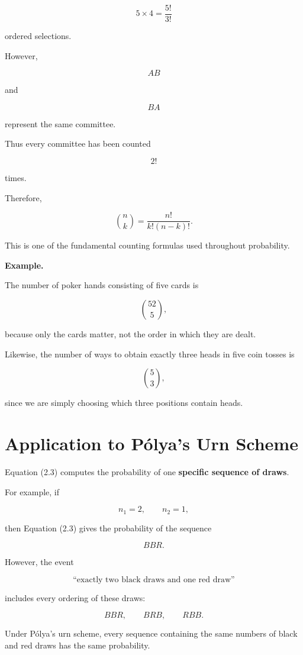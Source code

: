 \documentclass[12pt]{article}
\begin{document}
\[
5\times4
=
\frac{5!}{3!}
\]

ordered selections.

However,

\[
AB
\]

and

\[
BA
\]

represent the same committee.

Thus every committee has been counted

\[
2!
\]

times.

Therefore,

\[
\binom nk
=
\frac{n!}{k!(n-k)!}.
\]

This is one of the fundamental counting formulas used throughout
probability.

\bigskip

\textbf{Example.}

The number of poker hands consisting of five cards is

\[
\binom{52}{5},
\]

because only the cards matter, not the order in which they are dealt.

Likewise, the number of ways to obtain exactly three heads in five coin
tosses is

\[
\binom53,
\]

since we are simply choosing which three positions contain heads.

\section*{Application to Pólya's Urn Scheme}

Equation (2.3) computes the probability of one
\textbf{specific sequence of draws}.

For example, if

\[
n_1=2,\qquad n_2=1,
\]

then Equation (2.3) gives the probability of the sequence

\[
BBR.
\]

However, the event

\[
\text{``exactly two black draws and one red draw''}
\]

includes every ordering of these draws:

\[
BBR,\qquad
BRB,\qquad
RBB.
\]

Under Pólya's urn scheme, every sequence containing the same numbers of
black and red draws has the same probability.
\end{document}
